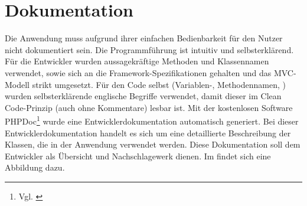 \section{Dokumentation}
\label{sec:Dokumentation}
Die Anwendung muss aufgrund ihrer einfachen Bedienbarkeit für den Nutzer nicht dokumentiert
sein. Die Programmführung ist intuitiv und selbsterklärend.
Für die Entwickler wurden aussagekräftige Methoden und Klassennamen verwendet, sowie
sich an die Framework-Spezifikationen gehalten und das MVC-Modell strikt umgesetzt.
Für den Code selbst (Variablen-, Methodennamen, \etc) wurden selbsterklärende
englische Begriffe verwendet, damit dieser im Clean Code-Prinzip (auch ohne
Kommentare) lesbar ist.
Mit der kostenlosen Software PHPDoc\footnote{Vgl. \cite{phpdoc}}  wurde eine Entwicklerdokumentation automatisch generiert. Bei dieser Entwicklerdokumentation handelt es sich um eine detaillierte Beschreibung der Klassen, die in der Anwendung verwendet werden. Diese Dokumentation soll dem Entwickler als Übersicht und Nachschlagewerk dienen. Im  findet sich eine Abbildung dazu.

